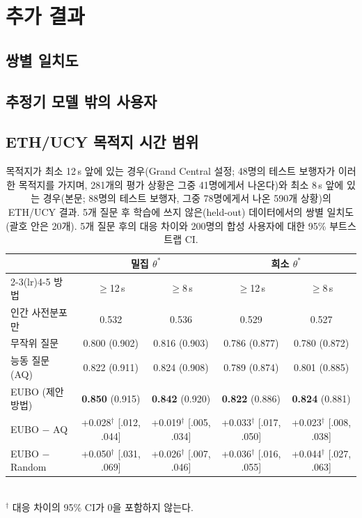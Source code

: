 \section{추가 결과}

\subsection{쌍별 일치도}


\subsection{추정기 모델 밖의 사용자}


\subsection{ETH/UCY 목적지 시간 범위}
\label{app:eth_dest}
\begin{table}[h]
\centering
\caption{목적지가 최소 12\,s 앞에 있는 경우(Grand Central 설정; 48명의 테스트 보행자가 이러한 목적지를 가지며, 281개의 평가 상황은 그중 41명에게서 나온다)와 최소 8\,s 앞에 있는 경우(본문; 88명의 테스트 보행자, 그중 78명에게서 나온 590개 상황)의 ETH/UCY 결과. 5개 질문 후 학습에 쓰지 않은(held-out) 데이터에서의 쌍별 일치도(괄호 안은 20개). 5개 질문 후의 대응 차이와 200명의 합성 사용자에 대한 95\% 부트스트랩 CI.}
\label{tab:eth_dest}
\setlength{\tabcolsep}{4pt}
\begin{tabular}{lcccc}
\toprule
 & \multicolumn{2}{c}{밀집 $\theta^*$} & \multicolumn{2}{c}{희소 $\theta^*$} \\
\cmidrule(lr){2-3}\cmidrule(lr){4-5}
방법 & $\geq$12\,s & $\geq$8\,s & $\geq$12\,s & $\geq$8\,s \\
\midrule
인간 사전분포만  & 0.532 & 0.536 & 0.529 & 0.527 \\
무작위 질문    & 0.800 \scriptsize{(0.902)} & 0.816 \scriptsize{(0.903)} & 0.786 \scriptsize{(0.877)} & 0.780 \scriptsize{(0.872)} \\
능동 질문 (AQ) & 0.822 \scriptsize{(0.911)} & 0.824 \scriptsize{(0.908)} & 0.789 \scriptsize{(0.874)} & 0.801 \scriptsize{(0.885)} \\
EUBO (제안 방법)       & \textbf{0.850} \scriptsize{(0.915)} & \textbf{0.842} \scriptsize{(0.920)} & \textbf{0.822} \scriptsize{(0.886)} & \textbf{0.824} \scriptsize{(0.881)} \\
\midrule
EUBO $-$ AQ       & +0.028$^\dagger$ \scriptsize{[.012, .044]} & +0.019$^\dagger$ \scriptsize{[.005, .034]} & +0.033$^\dagger$ \scriptsize{[.017, .050]} & +0.023$^\dagger$ \scriptsize{[.008, .038]} \\
EUBO $-$ Random   & +0.050$^\dagger$ \scriptsize{[.031, .069]} & +0.026$^\dagger$ \scriptsize{[.007, .046]} & +0.036$^\dagger$ \scriptsize{[.016, .055]} & +0.044$^\dagger$ \scriptsize{[.027, .063]} \\
\bottomrule
\end{tabular}
\\[2pt]{\scriptsize $^\dagger$ 대응 차이의 95\% CI가 0을 포함하지 않는다.}
\end{table}
